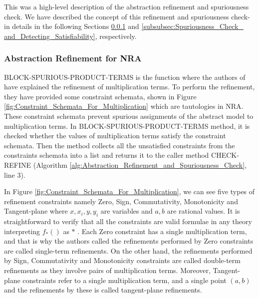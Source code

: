 \noindent This was a high-level description of the abstraction refinement and spuriousness check.
We have described the concept of this refinement and spuriousness check-in details in the following Sections \ref{subsubsec:Abstraction_Refinement_for_NRA} and \ref{subsubsec:Spuriousness_Check_ and_Detecting_Satisfiability}, respectively.
\subsubsection{Abstraction Refinement for NRA}
\label{subsubsec:Abstraction_Refinement_for_NRA}
\begin{sloppypar}
BLOCK-SPURIOUS-PRODUCT-TERMS is the function where the authors of \cite{Cimatti:2018:ILS:3274693.3230639} have explained the refinement of multiplication terms.
To perform the refinement, they have provided some constraint schemata, shown in Figure \ref{fig:Constraint_Schemata_For_Multiplication} which are tautologies in NRA.
These constraint schemata prevent spurious assignments of the abstract model to multiplication terms.
In BLOCK-SPURIOUS-PRODUCT-TERMS method, it is checked whether the values of multiplication terms satisfy the constraint schemata.
Then the method collects all the unsatisfied constraints from the constraints schemata into a list and returns it to the caller method CHECK-REFINE (Algorithm \ref{alg:Abstraction_Refinement_and_Spuriousness_Check}, line $3$).\newline
\end{sloppypar}

\noindent In Figure \ref{fig:Constraint_Schemata_For_Multiplication}, we can see five types of refinement constraints namely Zero, Sign, Commutativity,
Monotonicity and Tangent-plane where $x, x_{i},y, y_{i}$ are variables and $a, b$ are rational values.
It is straightforward to verify that all the constraints are valid formulae in any theory interpreting $f_{\ast}()$ as $\ast$ \cite{Cimatti:2018:ILS:3274693.3230639}.
Each Zero constraint has a single multiplication term, and that is why the authors called the refinements performed by Zero constraints are called single-term refinements.
On the other hand, the refinements performed by Sign, Commutativity and Monotonicity constraints are called double-term refinements as they involve pairs of multiplication terms.
Moreover, Tangent-plane constraints refer to a single multiplication term, and a single point $(a, b)$ and the refinements by these is called tangent-plane refinements.\newline

